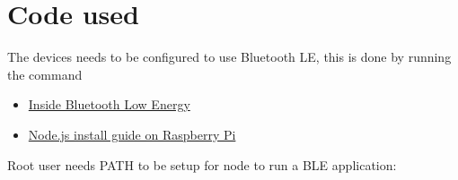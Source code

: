 
\section{Code used}
\label{appendix:codeused}

The devices needs to be configured to use Bluetooth LE, this is done by running the command 

\begin{itemize}
\item \href{http://books.google.dk/books?id=-LMq0NhoEQgC&pg=PA358&lpg=PA358&dq=EnableGatt&source=bl&ots=AXu2znOEUw&sig=PjvPAADd4H3WInDAEFszw1MALr8&hl=da&sa=X&ei=uilyU6biJIz6yAOH914CQCg&ved=0CIsBEOgBMAk#v=onepage&q=EnableGatt&f=false}
{Inside Bluetooth Low Energy}

\item \href{http://joshondesign.com/2013/10/23/noderpi}
{Node.js install guide on Raspberry Pi}

\end{itemize}

\noindent Root user needs PATH to be setup for node to run a BLE application:

